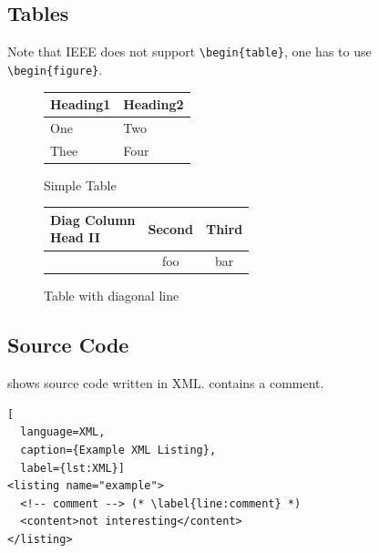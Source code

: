 \documentclass[conference,a4paper,english]{IEEEtran}[2015/08/26]
\begin{document}
\subsection{Tables}

Note that IEEE does not support \verb+\begin{table}+, one has to use \verb+\begin{figure}+.

\begin{ltgexample}
\begin{figure}
  \caption{Simple Table}
  \label{tab:simple}
  \centering
  \begin{tabular}{ll}
    \toprule
    Heading1 & Heading2 \\
    \midrule
    One      & Two      \\
    Thee     & Four     \\
    \bottomrule
  \end{tabular}
\end{figure}
\end{ltgexample}

\begin{ltgexample}
\begin{figure}
\caption{Table with diagonal line}
\label{tab:diag}
\begin{center}
\begin{tabular}{|l|c|c|}
\hline
\diagbox[width=10em]{Diag\\Column Head I}{Diag Column\\Head II} & Second & Third \\
\hline
& foo & bar \\
\hline
\end{tabular}
\end{center}
\end{figure}
\end{ltgexample}


\subsection{Source Code}

\begin{ltgexample}
 shows source code written in XML.
 contains a comment.

\begin{lstlisting}[
  language=XML,
  caption={Example XML Listing},
  label={lst:XML}]
<listing name="example">
  <!-- comment --> (* \label{line:comment} *)
  <content>not interesting</content>
</listing>
\end{lstlisting}
\end{ltgexample}
\end{document}

